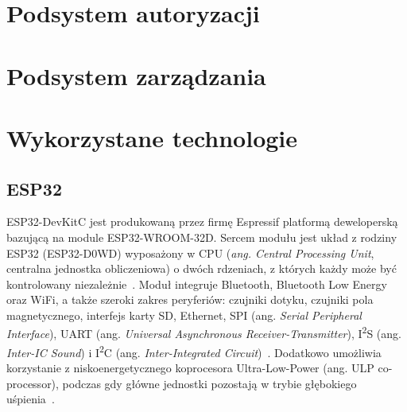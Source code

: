     \section{Podsystem autoryzacji}

    \section{Podsystem zarządzania}

    \section {Wykorzystane technologie}

        \subsection{ESP32}

            ESP32-DevKitC jest produkowaną przez firmę Espressif platformą deweloperską bazującą na module ESP32-WROOM-32D. Sercem modułu jest układ z rodziny ESP32 (ESP32-D0WD) wyposażony w CPU (\textit{ang. Central Processing Unit}, centralna jednostka obliczeniowa) o dwóch rdzeniach, z których każdy może być kontrolowany niezależnie~\cite{esp32-wroom32-ds}. Moduł integruje Bluetooth, Bluetooth Low Energy oraz WiFi, a także szeroki zakres peryferiów: czujniki dotyku, czujniki pola magnetycznego, interfejs karty SD, Ethernet, SPI (ang. \textit{Serial Peripheral Interface}), UART (ang. \textit{Universal Asynchronous Receiver-Transmitter}), I\textsuperscript{2}S (ang. \textit{Inter-IC Sound}) i I\textsuperscript{2}C (ang. \textit{Inter-Integrated Circuit})~\cite{esp32-wroom32-ds}. Dodatkowo umożliwia korzystanie z niskoenergetycznego koprocesora Ultra-Low-Power (ang. ULP co-processor), podczas gdy główne jednostki pozostają w trybie głębokiego uśpienia~\cite{esp32-tech-ref-man}.

